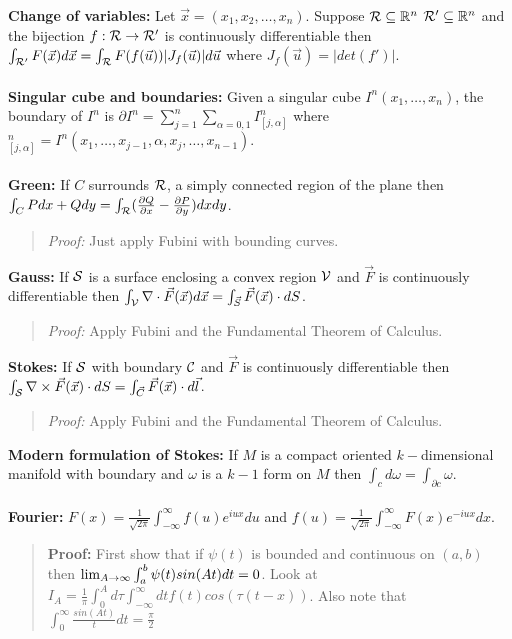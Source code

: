 {\bf Change of variables:} 
Let ${\vec x}= (x_1 , x_2 , \ldots , x_n)$.
Suppose 
${\cal R} \subseteq {\mathbb R}^n$
${\cal R}' \subseteq {\mathbb R}^n$ and the bijection
$f: {\cal R} \rightarrow {\cal R}'$ is continuously differentiable
then $\int_{{\cal R}'} F({\vec x}) d {\vec x}
= \int_{{\cal R}} F(f({\vec u})) |J_f({\vec u})| d {\vec u}$ where
$J_f({\vec u}) = | det(f')|$.
\\
\\
{\bf Singular cube and boundaries:} Given a singular cube $I^n(x_1 , \ldots , x_n)$, the boundary of $I^n$
is $\partial I^n = \sum_{j=1}^n \sum_{\alpha = 0, 1} I^n_{[j, \alpha]}$ where 
$^n_{[j, \alpha]} = I^n(x_1, \ldots, x_{j-1}, \alpha , x_{j}, \ldots , x_{n-1})$.
\\
\\
{\bf Green:} 
If $C$ surrounds ${\cal R}$, a simply connected
region of the plane then $\int_C P dx + Q dy= \int_{\cal R}
({\frac {\partial Q} {\partial x}} -
{\frac {\partial P} {\partial y}}) dx dy $.  
\begin{quote}
\emph{Proof:} Just apply Fubini with bounding curves.
\end{quote}
{\bf Gauss:} If ${\cal S}$ is a surface enclosing
a convex region ${\cal V}$ and ${\vec F}$ is continuously differentiable then
$\int_{\cal V} \nabla \cdot {\vec F} ({\vec x}) d{\vec x}
= \int_{\vec S} {\vec F}({\vec x}) \cdot dS$.
\begin{quote}
\emph{Proof:} Apply Fubini and the Fundamental Theorem of Calculus.
\end{quote}
{\bf Stokes:} If ${\cal S}$ with boundary
${\cal C}$ and ${\vec F}$ is continuously differentiable then
$\int_{\cal S} \nabla \times {\vec F} ({\vec x}) \cdot dS
= \int_{\vec C} {\vec F}({\vec x}) \cdot d{\vec l}$.
\begin{quote}
\emph{Proof:} Apply Fubini and the Fundamental Theorem of Calculus.
\end{quote}
{\bf Modern formulation of Stokes:} If $M$ is a compact oriented $k-$dimensional manifold with boundary
and $\omega$ is a $k-1$ form on $M$ then $\int_c d \omega = \int_{\partial c} \omega$.
\\
\\
{\bf Fourier:}
$F(x)= {\frac 1 {\sqrt {2 \pi}}} \int_{-\infty}^{\infty} f(u) e^{i u x} du$ and
$f(u)= {\frac 1 {\sqrt {2 \pi}}} \int_{-\infty}^{\infty} F(x) e^{-i u x} dx$.
\begin{quote}
{\bf Proof:} First show that if $\psi(t)$ is bounded and continuous on
$(a,b)$ then $\textnormal{lim}_{A \rightarrow \infty} \int^b_a \psi(t) sin(At) dt = 0$.
Look at $I_A= {\frac 1 {\pi}} \int^A_0 d \tau \int^{\infty}_{-\infty} dt f(t) cos( \tau (t-x))$.
Also note that $\int^{\infty}_0 {\frac {sin(At)} {t}} dt = {\frac {\pi} {2}}$
\end{quote}
